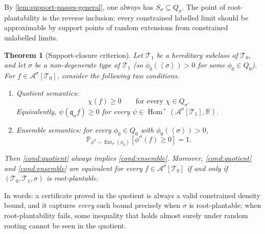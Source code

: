 \documentclass[11pt]{article}
\newtheorem{theorem}{Theorem}
\theoremstyle{definition}
\newcommand{\R}{\mathbb{R}}
\newcommand{\Prob}{\mathbb{P}}
\newcommand{\A}{\mathcal{A}}
\newcommand{\T}{\mathcal{T}}
\newcommand{\Homp}{\operatorname{Hom}^{+}}
\newcommand{\Ext}{\operatorname{Ext}}
\newcommand{\brak}[1]{\left\langle #1\right\rangle}
\newcommand{\qmap}{\mathfrak q}
\begin{document}
By \cref{lem:support-passes-general}, one always has $S_\sigma\subseteq Q_\sigma$.
The point of root-plantability is the reverse inclusion: every constrained
labelled limit should be approximable by support points of random extensions from
constrained unlabelled limits.

\begin{theorem}[Support-closure criterion]\label{thm:support-criterion}
Let $\T_1$ be a hereditary subclass of $\T_0$, and let $\sigma$ be a non-degenerate type of
$\T_1$ (so $\phi_0(\brak\sigma)>0$ for some $\phi_0\in Q_0$).  For
$f\in\A^\sigma[\T_0]$, consider the following two
conditions.
\begin{enumerate}[label=\textup{(\alph*)}, leftmargin=2.8em]
  \item\label{cond:quotient}
  Quotient semantics:
  \[
    \chi(f)\ge0\qquad\text{for every }\chi\in Q_\sigma.
  \]
  Equivalently, $\psi(\qmap_\sigma f)\ge0$ for every
  $\psi\in\Homp(\A^\sigma[\T_1],\R)$.
  \item\label{cond:ensemble}
  Ensemble semantics:
  for every $\phi_0\in Q_0$ with $\phi_0(\brak\sigma)>0$,
  \[
    \Prob_{\phi^\sigma\sim\Ext_\sigma(\phi_0)}[\phi^\sigma(f)\ge0]=1.
  \]
\end{enumerate}
Then \ref{cond:quotient} always implies \ref{cond:ensemble}.  Moreover,
\ref{cond:quotient} and \ref{cond:ensemble} are equivalent for every
$f\in\A^\sigma[\T_0]$ if and only if $(\T_0,\T_1,\sigma)$ is root-plantable.
\end{theorem}

In words: a certificate proved in the quotient is always a valid constrained density
bound, and it captures \emph{every} such bound precisely when $\sigma$ is
root-plantable; when root-plantability fails, some inequality that holds almost surely
under random rooting cannot be seen in the quotient.
\end{document}
